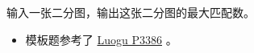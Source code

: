 \noindent 输入一张二分图，输出这张二分图的最大匹配数。

\begin{itemize}
    \item 模板题参考了 \href{https://www.luogu.com.cn/problem/P3386}{Luogu P3386} 。
\end{itemize}